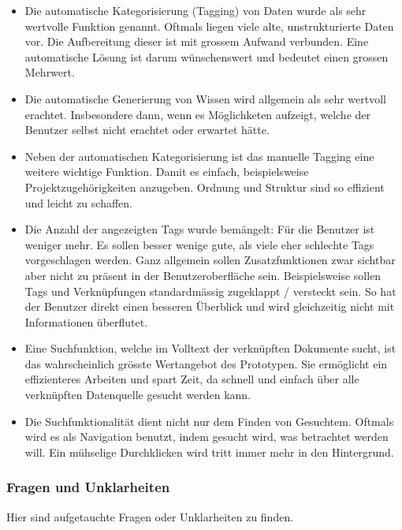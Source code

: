 \begin{itemize}
    \item Die automatische Kategorisierung (Tagging) von Daten wurde als sehr wertvolle Funktion genannt. Oftmals liegen viele alte, un\-struk\-tu\-rier\-te Daten vor. Die Aufbereitung dieser ist mit grossem Aufwand verbunden. Eine automatische Lösung ist darum wünsch\-ens\-wert und bedeutet einen grossen Mehrwert.
    \item Die automatische Generierung von Wissen wird allgemein als sehr wertvoll erachtet. Insbesondere dann, wenn es Mög\-lich\-ket\-en aufzeigt, welche der Benutzer selbst nicht erachtet oder erwartet hätte.
    \item Neben der automatischen Kategorisierung ist das manuelle Tagging eine weitere wichtige Funktion. Damit es einfach, beispielsweise Projektzugehörigkeiten anzugeben. Ordnung und Struktur sind so effizient und leicht zu schaffen.
    \item Die Anzahl der angezeigten Tags wurde bemängelt: Für die Benutzer ist weniger mehr. Es sollen besser wenige gute, als viele eher schlechte Tags vorgeschlagen werden. Ganz allgemein sollen Zusatzfunktionen zwar sichtbar aber nicht zu präsent in der Benutzeroberfläche sein. Beispielsweise sollen Tags und Verknüpfungen standardmässig zugeklappt / versteckt sein. So hat der Benutzer direkt einen besseren Überblick und wird gleichzeitig nicht mit Informationen überflutet.
    \item Eine Suchfunktion, welche im Volltext der verknüpften Dokumente sucht, ist das wahrscheinlich grösste Wertangebot des Prototypen. Sie ermöglicht ein effizienteres Arbeiten und spart Zeit, da schnell und einfach über alle verknüpften Datenquelle gesucht werden kann.
    \item Die Suchfunktionalität dient nicht nur dem Finden von Gesuchtem. Oftmals wird es als Navigation benutzt, indem gesucht wird, was betrachtet werden will. Ein mühselige Durchklicken wird tritt immer mehr in den Hintergrund.
\end{itemize}

\subsubsection{Fragen und Unklarheiten}
Hier sind aufgetauchte Fragen oder Unklarheiten zu finden.

